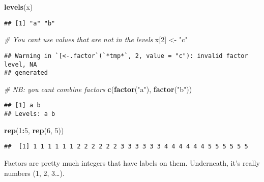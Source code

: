 \documentclass[
]{book}
\newenvironment{Shaded}{\begin{snugshade}}{\end{snugshade}}
\newcommand{\CommentTok}[1]{\textcolor[rgb]{0.56,0.35,0.01}{\textit{#1}}}
\newcommand{\DecValTok}[1]{\textcolor[rgb]{0.00,0.00,0.81}{#1}}
\newcommand{\KeywordTok}[1]{\textcolor[rgb]{0.13,0.29,0.53}{\textbf{#1}}}
\newcommand{\NormalTok}[1]{#1}
\newcommand{\OperatorTok}[1]{\textcolor[rgb]{0.81,0.36,0.00}{\textbf{#1}}}
\newcommand{\StringTok}[1]{\textcolor[rgb]{0.31,0.60,0.02}{#1}}
\begin{document}
\begin{Shaded}
\begin{Highlighting}[]
\KeywordTok{levels}\NormalTok{(x)}
\end{Highlighting}
\end{Shaded}

\begin{verbatim}
## [1] "a" "b"
\end{verbatim}

\begin{Shaded}
\begin{Highlighting}[]
\CommentTok{\# You can\textquotesingle{}t use values that are not in the levels}
\NormalTok{x[}\DecValTok{2}\NormalTok{] \textless{}{-}}\StringTok{ "c"}
\end{Highlighting}
\end{Shaded}

\begin{verbatim}
## Warning in `[<-.factor`(`*tmp*`, 2, value = "c"): invalid factor level, NA
## generated
\end{verbatim}

\begin{Shaded}
\begin{Highlighting}[]
\CommentTok{\# NB: you can\textquotesingle{}t combine factors}
\KeywordTok{c}\NormalTok{(}\KeywordTok{factor}\NormalTok{(}\StringTok{"a"}\NormalTok{), }\KeywordTok{factor}\NormalTok{(}\StringTok{"b"}\NormalTok{))}
\end{Highlighting}
\end{Shaded}

\begin{verbatim}
## [1] a b
## Levels: a b
\end{verbatim}

\begin{Shaded}
\begin{Highlighting}[]
\KeywordTok{rep}\NormalTok{(}\DecValTok{1}\OperatorTok{:}\DecValTok{5}\NormalTok{, }\KeywordTok{rep}\NormalTok{(}\DecValTok{6}\NormalTok{, }\DecValTok{5}\NormalTok{))}
\end{Highlighting}
\end{Shaded}

\begin{verbatim}
##  [1] 1 1 1 1 1 1 2 2 2 2 2 2 3 3 3 3 3 3 4 4 4 4 4 4 5 5 5 5 5 5
\end{verbatim}

Factors are pretty much integers that have labels on them. Underneath, it's really numbers (1, 2, 3\ldots).
\end{document}
